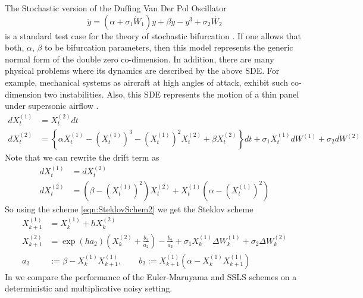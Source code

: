 	The Stochastic version of the  Duffing Van Der Pol Oscillator 
	\begin{equation}\label{eqn:StochasticDvdPOscillator}
		\ddot{y}= (\alpha +\sigma_1 \dot{W}_1)y+
			\beta \dot{y} - y^3 +\sigma_2 \dot{W_2}
	\end{equation}
is a standard test case for the theory of stochastic bifurcation 
\cite{He2004, Arnold1998, Keller1999, Schenk-Hoppe1996a, Schenk-Hoppe1996b, Wei1997}. If one allows that both, 
$\alpha$, $\beta$ to be bifurcation parameters, then this model represents the generic normal form of the double zero 
co-dimension. In addition, there are many physical problems where its dynamics are described by the above SDE. For
example, mechanical systems as aircraft at high angles of attack, exhibit such co-dimension two instabilities. Also,
this SDE represents the motion of a thin panel under supersonic airflow \cite{dowell1966nonlinear}.
%
\begin{align}
	dX_t^{(1)}
		&= X_t^{(2)} dt \label{eqn:GenDuffingVanDerPolSDE1}\\
	dX_t^{(2)} &=
	\left\{
		\alpha X_t^{(1)} 
		- \left( X_t ^ {(1)} \right) ^ 3
		- \left( X_t ^ {(1)} \right) ^ 2 X_t ^ {(2)}
		+\beta X_t^{(2)}
	\right\}dt
	+ \sigma_1 X_t^{(1)} dW^{(1)}
	+ \sigma_2 dW^{(2)}
	\label{eqn:GenDuffingVanDerPolSDE2}
\end{align}
Note that we can rewrite the drift term as 
\begin{align*}
	dX^{(1)}_t &= dX^{(2)}_t\\
	dX^{(2)}_t &= 
		\left(
			\beta - \left(X^{(1)}_t \right)^2
		\right) X^{(2)}_t
		+ X^{(1)}_t
		\left(
			\alpha - \left(X^{(1)}_t \right)^2
		\right)
\end{align*}
So using the scheme \eqref{eqn:SteklovSchem2} we get the Steklov scheme
\begin{align*}
	X^{(1)}_{k+1} &= X^{(1)}_k + hX^{(2)}_k\\
	X^{(2)}_{k+1} &= 
		\exp \left(
			h a_2
		\right)
		\left(
			X^{(2)}_k + \frac{b_2}{a_2}
		\right)
		- \frac{b_2}{a_2}
		+\sigma_1 X_k^{(1)} \Delta W^{(1)}_k
		+\sigma_2 \Delta W^{(2)}_k
		\\
	a_2 &:= \beta-X^{(1)}_k X^{(1)}_{k+1}, \qquad 
	b_2 := 
		X^{(1)}_{k+1} \left(
			\alpha -X^{(1)}_{k}X^{(1)}_{k+1}
		\right)
\end{align*}
In  we compare the performance of the Euler-Maruyama and SSLS schemes on a 
deterministic and multiplicative noisy setting.
